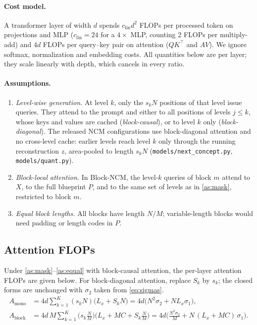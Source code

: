 \paragraph{Cost model.} A transformer layer of width $d$ spends
$c_{\mathrm{lin}}d^2$ FLOPs per processed token on projections and MLP
($c_{\mathrm{lin}}=24$ for a $4\times$ MLP, counting 2 FLOPs per multiply-add) and
$4d$ FLOPs per query--key pair on attention ($QK^\top$ and $AV$). We ignore
softmax, normalization and embedding costs. All quantities below are per layer;
they scale linearly with depth, which cancels in every ratio.

\paragraph{Assumptions.}
\begin{enumerate}[label=(A\arabic*),leftmargin=*,itemsep=1pt]
  \item \label{as:mask} \emph{Level-wise generation.} At level $k$, only the
  $s_kN$ positions of that level issue queries. They attend to the prompt and
  either to all positions of levels $j\le k$, whose keys and values are cached
  (\emph{block-causal}), or to level $k$ only (\emph{block-diagonal}). The
  released NCM configurations use block-diagonal attention and no cross-level
  cache: earlier levels reach level $k$ only through the running reconstruction
  $\hat z$, area-pooled to length $s_kN$ (\texttt{models/next\_concept.py},
  \texttt{models/quant.py}).
  \item \label{as:block} \emph{Block-local attention.} In Block-NCM, the level-$k$
  queries of block $m$ attend to $X$, to the full blueprint $P$, and to the
  same set of levels as in \ref{as:mask}, restricted to block $m$.
  \item \label{as:equal} \emph{Equal block lengths.} All blocks have length $N/M$;
  variable-length blocks would need padding or length codes in $P$.
\end{enumerate}

\subsection{Attention FLOPs}

\begin{proposition}
\label{prop:attn}
Under \ref{as:mask}--\ref{as:equal} with block-causal attention, the per-layer
attention FLOPs are given below. For block-diagonal attention, replace $S_k$ by
$s_k$; the closed forms are unchanged with $\sigma_2$ taken from
\eqref{eq:sigmas}.
\begin{align}
  A_{\mathrm{mono}}
  &= 4d\sum_{k=1}^{K}(s_kN)\big(L_x+S_kN\big)
   = 4d\big(N^2\sigma_2+NL_x\sigma_1\big),
  \label{eq:attn-mono}\\
  A_{\mathrm{block}}
  &= 4d\,M\sum_{k=1}^{K}\Big(s_k\frac{N}{M}\Big)\Big(L_x+MC+S_k\frac{N}{M}\Big)
   = 4d\Big(\frac{N^2\sigma_2}{M}+N\,(L_x+MC)\,\sigma_1\Big).
  \label{eq:attn-block}
\end{align}
\end{proposition}

